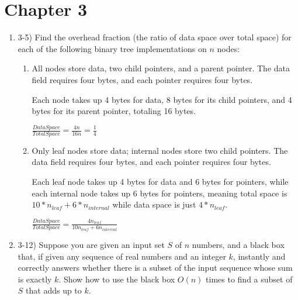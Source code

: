 \documentclass{article}
\begin{document}
\section{Chapter 3}
\begin{enumerate}
    \item 3-5) Find the overhead fraction (the ratio of data space over total space) for each of the following binary tree implementations on $n$ nodes:
    \begin{enumerate}
        \item All nodes store data, two child pointers, and a parent pointer. The data field requires four bytes, and each pointer requires four bytes. 
        
        Each node takes up 4 bytes for data, 8 bytes for its child pointers, and 4 bytes for its parent pointer, totaling 16 bytes.
        
        $\frac{DataSpace}{TotalSpace}=\frac{4n}{16n}=\boxed{\frac{1}{4}}$
        
        \item Only leaf nodes store data; internal nodes store two child pointers. The data field requires four bytes, and each pointer requires four bytes.

        Each leaf node takes up 4 bytes for data and 6 bytes for pointers, while each internal node takes up 6 bytes for pointers, meaning total space is $10*n_{leaf} + 6*n_{internal}$ while data space is just $4*n_{leaf}$.

        $\frac{DataSpace}{TotalSpace}=\boxed{\frac{4n_{leaf}}{10n_{leaf}+6n_{interval}}}$

    \end{enumerate}
    \item 3-12) Suppose you are given an input set $S$ of $n$ numbers, and a black box that, if given any sequence of real numbers and an integer $k$, instantly and correctly answers whether there is a subset of the input sequence whose sum is exactly $k$. Show how to use the black box $O(n)$ times to find a subset of $S$ that adds up to $k$.

\end{enumerate}
\end{document}
